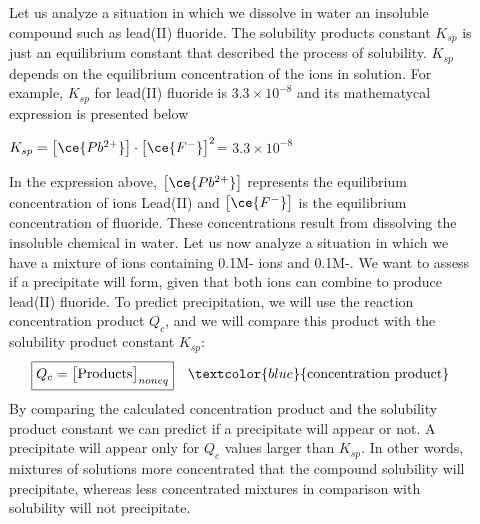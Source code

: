 \documentclass[main.tex]{subfiles}
\newcommand\chapterlabel{soluble}
\begin{document}
\begin{description}
\item[] 
Let us analyze a situation in which we dissolve in water an insoluble compound such as lead(II) fluoride. The solubility products constant $K_{sp}$ is just an equilibrium constant that described the process of solubility. $K_{sp}$ depends on the equilibrium concentration of the ions in solution. For example, $K_{sp}$ for lead(II) fluoride is $3.3\times10^{-8}$ and its mathematycal expression is presented below
\begin{center}\hfill $K_{sp}= \big[ \ce{Pb^{2+}} \big]\cdot \big[ \ce{F^{-}} \big]^2$= $3.3\times10^{-8}$\end{center}
In the expression above, $\big[ \ce{Pb^{2+}} \big]$ represents the equilibrium concentration of ions Lead(II) and $\big[ \ce{F^{-}} \big]$ is the equilibrium concentration of fluoride. These concentrations result from dissolving the insoluble chemical in water.
Let us now analyze a situation in which we have a mixture of ions containing 0.1M- ions and 0.1M-. We want to assess if a precipitate will form, given that both ions can combine to produce lead(II) fluoride. To predict precipitation, we will use the reaction concentration product $Q_c$, and we will compare this product with the solubility product constant $K_{sp}$:
\begin{equation}
\boxed{  Q_{c}=\big[\text{Products}\big]_{noneq} } \quad \textcolor{blue}{\text{concentration product}}\label{\chapterlabel:equation4}
\end{equation}
By comparing the calculated concentration product and the solubility product constant we can predict if a precipitate will appear or not. A precipitate will appear only for $Q_c$ values larger than $K_{sp}$. In other words, mixtures of solutions more concentrated that the compound solubility will precipitate, whereas  less concentrated mixtures in comparison with solubility will not precipitate.


\end{description}
\end{document}
